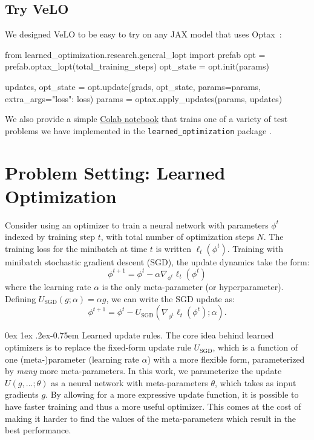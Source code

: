 \documentclass[11pt]{article}
\makeatletter
\renewcommand{\paragraph}{%
  \@startsection{paragraph}{4}%
  {\z@}{0ex \@plus 1ex \@minus .2ex}{-0.75em}%
  {\normalfont\normalsize\bfseries}%
}
\makeatother
\begin{document}
\subsection{Try VeLO}
We designed VeLO to be easy to try on any JAX model that uses Optax~\citep{deepmind2020jax}: 
\begin{python}
from learned_optimization.research.general_lopt import prefab
opt = prefab.optax_lopt(total_training_steps)
opt_state = opt.init(params)

updates, opt_state = opt.update(grads, opt_state, params=params, 
                                    extra_args={"loss": loss})
params = optax.apply_updates(params, updates)
\end{python}


We also provide a simple \href{https://colab.sandbox.google.com/github/google/learned_optimization/blob/main/learned_optimization/research/general_lopt/Demo_for_training_a_model_with_a_learned_optimizer.ipynb}{Colab notebook} that trains one of a variety of test problems we have implemented in the \texttt{learned\_optimization} package \citep{metz2022practical}.


\section{Problem Setting: Learned Optimization}

Consider using an optimizer to train a neural network with parameters $\phi^t$ indexed by training step $t$, with total number of optimization steps $N$. The training loss for the minibatch at time $t$ is written $\ell_t(\phi^t)$.
Training with minibatch stochastic gradient descent (SGD), the update dynamics take the form:
\begin{equation}
    \phi^{t+1} = \phi^t - \alpha \nabla_{\phi^t} \ell_t(\phi^t)
\end{equation}
where the learning rate $\alpha$ is the only meta-parameter (or hyperparameter). 
Defining $U_\text{SGD}(g; \alpha) = \alpha g$, we can write the SGD update as: 
\begin{equation}
    \phi^{t+1} = \phi^t - U_\text{SGD}\left(\nabla_{\phi^t} \ell_t(\phi^t); \alpha\right).
\end{equation}

\paragraph{Learned update rules.} The core idea behind learned optimizers is to replace the fixed-form update rule $U_\text{SGD}$, which is a function of one (meta-)parameter (learning rate $\alpha$) with a more flexible form, parameterized by \textit{many} more meta-parameters. 
In this work, we parameterize the update $U(g, ...; \theta)$ as a neural network with meta-parameters $\theta$, which takes as input gradients $g$.
By allowing for a more expressive update function, it is possible to have faster training and thus a more useful optimizer.
This comes at the cost of making it harder to find the values of the meta-parameters which result in the best performance.
\end{document}
